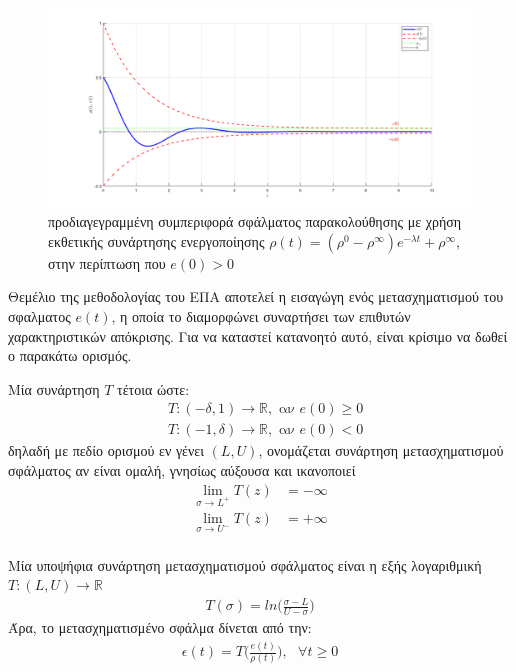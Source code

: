 \begin{definition}
\bigskip
\begin{figure}[!ht]
  \begin{center}
    \includegraphics[width=1\linewidth]{Chapters/Chapter1/Figures/rho_function.png}
    \caption[προδιαγεγραμμένη συμπεριφορά σφάλματος παρακολούθησης με χρήση εκθετικής συνάρτησης ενεργοποίησης $\rho(t) = (\rho^{0} - \rho^{\infty})e^{-\lambda t} + \rho^{\infty} = (1 - 0.03)e^(-0.8t) + 0.03$ και $\delta = 0.4$, στην περίπτωση που $e(0)>0$]{προδιαγεγραμμένη συμπεριφορά σφάλματος παρακολούθησης με χρήση εκθετικής συνάρτησης ενεργοποίησης $\rho(t) = (\rho^{0} - \rho^{\infty})e^{-\lambda t} + \rho^{\infty}$, στην περίπτωση που $e(0)>0$}
    \label{rho_function}
  \end{center}
\end{figure}
\end{definition}

Θεμέλιο της μεθοδολογίας του ΕΠΑ αποτελεί η εισαγώγη ενός μετασχηματισμού του σφαλματος $e(t)$, η οποία το διαμορφώνει συναρτήσει των επιθυτών χαρακτηριστικών απόκρισης. Για να καταστεί κατανοητό αυτό, είναι κρίσιμο να δωθεί ο παρακάτω ορισμός.

\begin{definition} \label{T_function_def}
Μία συνάρτηση $T$ τέτοια ώστε:
\begin{align}
  &T: (-\delta, 1) \rightarrow \mathbb{R}, \text{ αν } e(0) \geq 0 \label{T_function_positive_e}\\
  &T: (-1, \delta) \rightarrow \mathbb{R}, \text{ αν } e(0) < 0 \label{T_function_negative_e}
\end{align}
δηλαδή με πεδίο ορισμού εν γένει $(L, U)$, ονομάζεται συνάρτηση μετασχηματισμού σφάλματος αν είναι ομαλή, γνησίως αύξουσα και ικανοποιεί
\begin{align*}
  \lim_{\sigma \rightarrow L^{+}}T(z) &= -\infty \\
  \lim_{\sigma \rightarrow U^{-}}T(z) &= +\infty \\
\end{align*}

\bigskip
Μία υποψήφια συνάρτηση μετασχηματισμού σφάλματος είναι η εξής λογαριθμική $T: (L, U) \rightarrow \mathbb{R}$
\begin{gather}
  T(\sigma) = ln\bigg( \frac{\sigma-L}{U-\sigma} \bigg) \label{T_function}
\end{gather}
Άρα, το μετασχηματισμένο σφάλμα δίνεται από την:
\begin{gather*}
  \epsilon(t)=T\bigg(\frac{e(t)}{\rho(t)}\bigg),\text{ } \forall t \geq 0
\end{gather*}
\end{definition}

